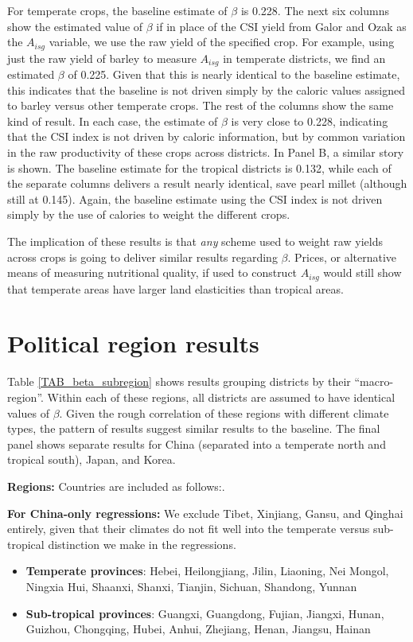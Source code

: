 \documentclass[11pt]{article}
\begin{document}
For temperate crops, the baseline estimate of $\beta$ is 0.228. The next six columns show the estimated value of $\beta$ if in place of the CSI yield from Galor and Ozak as the $A_{isg}$ variable, we use the raw yield of the specified crop. For example, using just the raw yield of barley to measure $A_{isg}$ in temperate districts, we find an estimated $\beta$ of 0.225. Given that this is nearly identical to the baseline estimate, this indicates that the baseline is not driven simply by the caloric values assigned to barley versus other temperate crops. The rest of the columns show the same kind of result. In each case, the estimate of $\beta$ is very close to 0.228, indicating that the CSI index is not driven by caloric information, but by common variation in the raw productivity of these crops across districts. In Panel B, a similar story is shown. The baseline estimate for the tropical districts is 0.132, while each of the separate columns delivers a result nearly identical, save pearl millet (although still at 0.145). Again, the baseline estimate using the CSI index is not driven simply by the use of calories to weight the different crops.

The implication of these results is that \textit{any} scheme used to weight raw yields across crops is going to deliver similar results regarding $\beta$. Prices, or alternative means of measuring nutritional quality, if used to construct $A_{isg}$ would still show that temperate areas have larger land elasticities than tropical areas.

\section{Political region results}
Table \ref{TAB_beta_subregion} shows results grouping districts by their ``macro-region''. Within each of these regions, all districts are assumed to have identical values of $\beta$. Given the rough correlation of these regions with different climate types, the pattern of results suggest similar results to the baseline. The final panel shows separate results for China (separated into a temperate north and tropical south), Japan, and Korea. 

\noindent\textbf{Regions:} Countries are included as follows:. 
\begin{itemize}
    \setlength\itemsep{0pt}
    
\end{itemize}

\noindent\textbf{For China-only regressions:} We exclude Tibet, Xinjiang, Gansu, and Qinghai entirely, given that their climates do not fit well into the temperate versus sub-tropical distinction we make in the regressions.
\begin{itemize}
    \setlength\itemsep{0pt}
    \item \textbf{Temperate provinces}: Hebei, Heilongjiang, Jilin, Liaoning, Nei Mongol, Ningxia Hui, Shaanxi, Shanxi, Tianjin, Sichuan, Shandong, Yunnan
    \item \textbf{Sub-tropical provinces}: Guangxi, Guangdong, Fujian, Jiangxi, Hunan, Guizhou, Chongqing, Hubei, Anhui, Zhejiang, Henan, Jiangsu, Hainan
\end{itemize}
\end{document}
